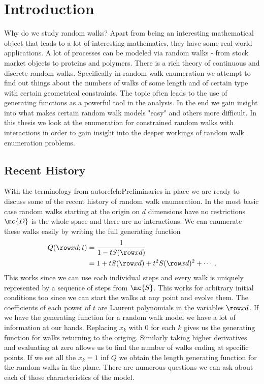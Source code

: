 
\chapter{Introduction}
\label{ch:Introduction}

Why do we study random walks? Apart from being an interesting mathematical object that leads to a lot of interesting mathematics, they have some real world applications. A lot of processes can be modeled via random walks - from stock market objects to proteins and polymers. There is a rich theory of continuous and discrete random walks. Specifically in random walk enumeration we attempt to find out things about the numbers of walks of some length and of certain type with certain geometrical constraints. The topic often leads to the use of generating functions as a powerful tool in the analysis. In the end we gain insight into what makes certain random walk models "easy" and others more difficult. In this thesis we look at the enumeration for constrained random walks with interactions in order to gain insight into the deeper workings of random walk enumeration problems.
\section{Recent History}

With the terminology from autoref{ch:Preliminaries} in place we are ready to discuss some of the recent history of random walk enumeration. In the most basic case random walks starting at the origin on $d$ dimensions have no restrictions $\mc{D}$ is the whole space and there are no interactions. We can enumerate these walks easily by writing the full generating function
\begin{align}
\begin{split}
	Q(\row xd;t) &= \frac{1}{1-tS(\row xd)} \\
			&= 1 + tS(\row xd) + t^2 S(\row xd)^2 + \cdots\,.
\end{split}
\end{align}
This works since we can use each individual steps and every walk is uniquely represented by a sequence of steps from $\mc{S}$. This works for arbitrary initial conditions too since we can start the walks at any point and evolve them. The coefficients of each power of $t$ are Laurent polynomials in the variables $\row xd$. If we have the generating function for a random walk model we have a lot of information at our hands. Replacing $x_k$ with $0$ for each $k$ gives us the generating function for walks returning to the origing. Similarly taking higher derivatives and evaluating at zero allows us to find the number of walks ending at specific points. If we set all the $x_k = 1$ inf $Q$ we obtain the length generating function for the random walks in the plane. There are numerous questions we can ask about each of those characteristics of the model.

